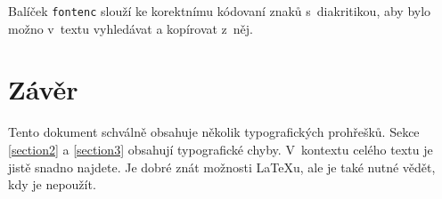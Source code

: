 \documentclass[10pt,twocolumn]{article}
\begin{document}
Balíček \texttt{fontenc} slouží ke korektnímu kódovaní znaků s~diakritikou, aby bylo možno v~textu vyhledávat a kopírovat z~něj.


\section{Závěr}
Tento dokument schválně obsahuje několik typografických prohřešků.
Sekce \ref{section2} a \ref{section3} obsahují typografické chyby.
V~kontextu celého textu je jistě snadno najdete.
Je dobré znát možnosti \LaTeX u, ale je také nutné vědět, kdy je nepoužít.
\end{document}
